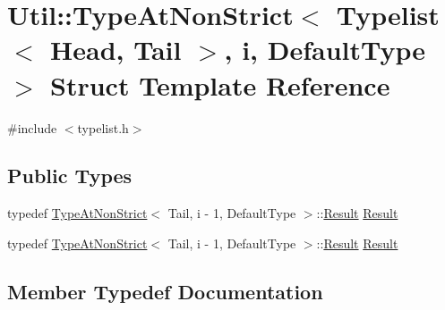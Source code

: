 \hypertarget{structUtil_1_1TL_1_1TypeAtNonStrict_3_01Typelist_3_01Head_00_01Tail_01_4_00_01i_00_01DefaultType_01_4}{}\section{Util\+:\+:Type\+At\+Non\+Strict$<$ Typelist$<$ Head, Tail $>$, i, Default\+Type $>$ Struct Template Reference}
\label{structUtil_1_1TL_1_1TypeAtNonStrict_3_01Typelist_3_01Head_00_01Tail_01_4_00_01i_00_01DefaultType_01_4}


{\ttfamily \#include $<$typelist.\+h$>$}

\subsection*{Public Types}
\begin{DoxyCompactItemize}
\item 
typedef \mbox{\hyperlink{structUtil_1_1TL_1_1TypeAtNonStrict}{Type\+At\+Non\+Strict}}$<$ Tail, i -\/ 1, Default\+Type $>$\+::\mbox{\hyperlink{structUtil_1_1TL_1_1TypeAtNonStrict_3_01Typelist_3_01Head_00_01Tail_01_4_00_01i_00_01DefaultType_01_4_a8373e5740e40b58eb026277b65fdd1de}{Result}} \mbox{\hyperlink{structUtil_1_1TL_1_1TypeAtNonStrict_3_01Typelist_3_01Head_00_01Tail_01_4_00_01i_00_01DefaultType_01_4_a8373e5740e40b58eb026277b65fdd1de}{Result}}
\item 
typedef \mbox{\hyperlink{structUtil_1_1TL_1_1TypeAtNonStrict}{Type\+At\+Non\+Strict}}$<$ Tail, i -\/ 1, Default\+Type $>$\+::\mbox{\hyperlink{structUtil_1_1TL_1_1TypeAtNonStrict_3_01Typelist_3_01Head_00_01Tail_01_4_00_01i_00_01DefaultType_01_4_a8373e5740e40b58eb026277b65fdd1de}{Result}} \mbox{\hyperlink{structUtil_1_1TL_1_1TypeAtNonStrict_3_01Typelist_3_01Head_00_01Tail_01_4_00_01i_00_01DefaultType_01_4_a8373e5740e40b58eb026277b65fdd1de}{Result}}
\end{DoxyCompactItemize}


\subsection{Member Typedef Documentation}
\mbox{\label{structUtil_1_1TL_1_1TypeAtNonStrict_3_01Typelist_3_01Head_00_01Tail_01_4_00_01i_00_01DefaultType_01_4_a8373e5740e40b58eb026277b65fdd1de}} 
